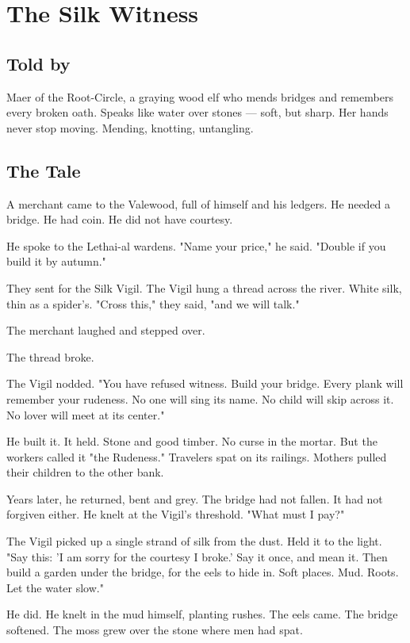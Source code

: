 \chapter{The Silk Witness}

\section*{Told by}

Maer of the Root-Circle, a graying wood elf who mends bridges and remembers every broken oath. Speaks like water over stones --- soft, but sharp. Her hands never stop moving. Mending, knotting, untangling.

\section*{The Tale}

A merchant came to the Valewood, full of himself and his ledgers. He needed a bridge. He had coin. He did not have courtesy.

He spoke to the Lethai-al wardens. "Name your price," he said. "Double if you build it by autumn."

They sent for the Silk Vigil. The Vigil hung a thread across the river. White silk, thin as a spider's. "Cross this," they said, "and we will talk."

The merchant laughed and stepped over.

The thread broke.

The Vigil nodded. "You have refused witness. Build your bridge. Every plank will remember your rudeness. No one will sing its name. No child will skip across it. No lover will meet at its center."

He built it. It held. Stone and good timber. No curse in the mortar. But the workers called it "the Rudeness." Travelers spat on its railings. Mothers pulled their children to the other bank.

Years later, he returned, bent and grey. The bridge had not fallen. It had not forgiven either. He knelt at the Vigil's threshold. "What must I pay?"

The Vigil picked up a single strand of silk from the dust. Held it to the light. "Say this: 'I am sorry for the courtesy I broke.' Say it once, and mean it. Then build a garden under the bridge, for the eels to hide in. Soft places. Mud. Roots. Let the water slow."

He did. He knelt in the mud himself, planting rushes. The eels came. The bridge softened. The moss grew over the stone where men had spat.

